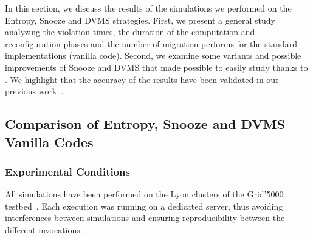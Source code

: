 

In this section, we discuss the results of the simulations we
performed on the Entropy, Snooze and DVMS strategies. First, we
present a general study analyzing the violation times, the
duration of the computation and reconfiguration phases and the number
of migration performs for the standard implementations (\aka vanilla code).
Second, we examine some variants and possible
improvements of Snooze and DVMS that made possible to easily study  thanks to
\vmps. We highlight that the accuracy of the results have been
validated in our previous work~\cite{vmplaces:europar15}.

 \subsection{Comparison of Entropy, Snooze and DVMS Vanilla Codes}
%
\subsubsection{Experimental Conditions}
All simulations have been
performed on the Lyon clusters of the Grid'5000 testbed~\cite{grid5000}.
Each execution was running on a dedicated server, thus avoiding
interferences between simulations and ensuring reproducibility between
the different invocations.



